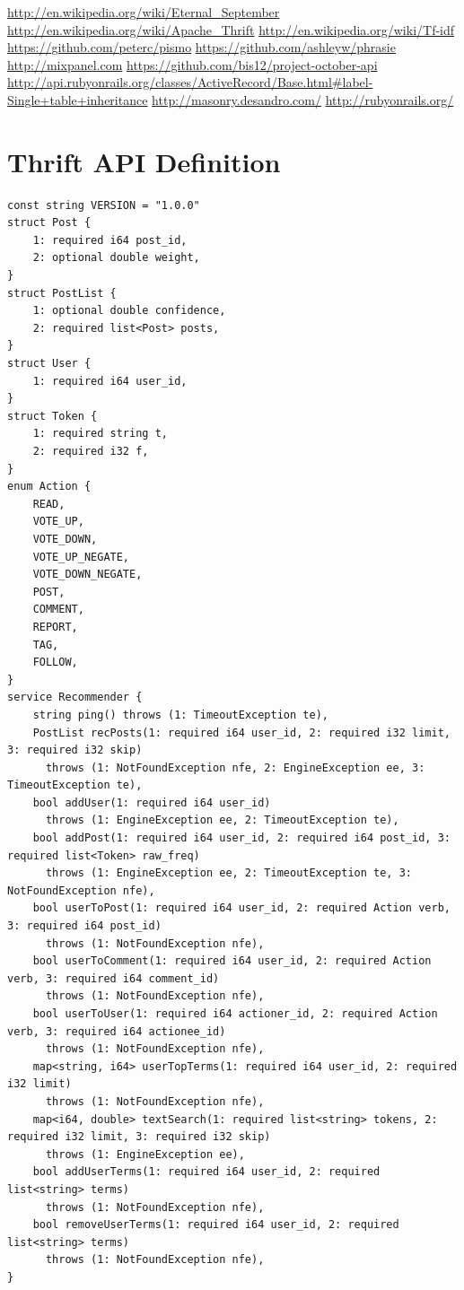 \documentclass[11pt,letterpaper]{article}
\begin{document}
\newpage
\newpage
\begin{thebibliography}{6}
   \url{http://en.wikipedia.org/wiki/Eternal\_September}
   \url{http://en.wikipedia.org/wiki/Apache\_Thrift}
   \url{http://en.wikipedia.org/wiki/Tf-idf}
   \url{https://github.com/peterc/pismo}
   \url{https://github.com/ashleyw/phrasie}
   \url{http://mixpanel.com}
   \url{https://github.com/bis12/project-october-api}
   \url{http://api.rubyonrails.org/classes/ActiveRecord/Base.html#label-Single+table+inheritance}
   \url{http://masonry.desandro.com/}
   \url{http://rubyonrails.org/}
\end{thebibliography}

\newpage
\appendix
\section{Thrift API Definition}
\label{app:thrift}
\begin{verbatim}
const string VERSION = "1.0.0"
struct Post {
    1: required i64 post_id,
    2: optional double weight,
}
struct PostList {
    1: optional double confidence,
    2: required list<Post> posts,
}
struct User {
    1: required i64 user_id,
}
struct Token {
    1: required string t,
    2: required i32 f,
}
enum Action {
    READ,
    VOTE_UP,
    VOTE_DOWN,
    VOTE_UP_NEGATE,
    VOTE_DOWN_NEGATE,
    POST,
    COMMENT,
    REPORT,
    TAG,
    FOLLOW,
}
service Recommender {
    string ping() throws (1: TimeoutException te),
    PostList recPosts(1: required i64 user_id, 2: required i32 limit, 3: required i32 skip)
      throws (1: NotFoundException nfe, 2: EngineException ee, 3: TimeoutException te),
    bool addUser(1: required i64 user_id)
      throws (1: EngineException ee, 2: TimeoutException te),
    bool addPost(1: required i64 user_id, 2: required i64 post_id, 3: required list<Token> raw_freq)
      throws (1: EngineException ee, 2: TimeoutException te, 3: NotFoundException nfe),
    bool userToPost(1: required i64 user_id, 2: required Action verb, 3: required i64 post_id)
      throws (1: NotFoundException nfe),
    bool userToComment(1: required i64 user_id, 2: required Action verb, 3: required i64 comment_id)
      throws (1: NotFoundException nfe),
    bool userToUser(1: required i64 actioner_id, 2: required Action verb, 3: required i64 actionee_id)
      throws (1: NotFoundException nfe),
    map<string, i64> userTopTerms(1: required i64 user_id, 2: required i32 limit)
      throws (1: NotFoundException nfe),
    map<i64, double> textSearch(1: required list<string> tokens, 2: required i32 limit, 3: required i32 skip)
      throws (1: EngineException ee),
    bool addUserTerms(1: required i64 user_id, 2: required list<string> terms)
      throws (1: NotFoundException nfe),
    bool removeUserTerms(1: required i64 user_id, 2: required list<string> terms)
      throws (1: NotFoundException nfe),
}
\end{verbatim}
\end{document}

